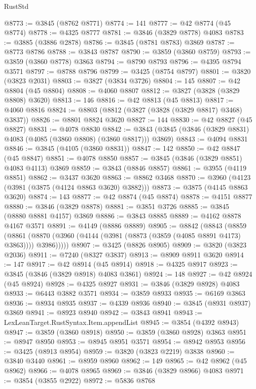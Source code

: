 \begin{lexlean}{RustStd}
\begin{coremodule}
@8773 := @3845 (@8762 @8771)
@8774 := 141
@8777 := @42 @8774 (@45 @8774)
@8778 := @4325 @8777
@8781 := @3846 (@3829 @8778) @4083
@8783 := @3885 (@3886 @2878)
@8786 := @3845 (@8781 @8783) @3869
@8787 := @8773 @8786
@8788 := @3843 @8787
@8790 := @3859 (@3860 @8759)
@8793 := @3859 (@3860 @8778) @3863
@8794 := @8790 @8793
@8796 := @4395 @8794 @3571
@8797 := @8788 @8796
@8799 := @3425 (@8754 @8797)
@8801 := @3820 (@3823 @2031)
@8803 := @3827 (@3834 @3726)
@8804 := 145
@8807 := @42 @8804 (@45 @8804)
@8808 := @4060 @8807
@8812 := @3827 (@3828 (@3829 @8808) @3620)
@8813 := 146
@8816 := @42 @8813 (@45 @8813)
@8817 := @4060 @8816
@8824 := @8803 (@8812 (@3827 (@3828 (@3829 @8817) @3468) @3837))
@8826 := @8801 @8824 @3620
@8827 := 144
@8830 := @42 @8827 (@45 @8827)
@8831 := @4078 @8830
@8842 := @3843 (@3845 (@3846 (@3829 @8831) @4083 (@4085 (@3860 @8808) (@3860 @8817))) @3869)
@8843 := @4094 @8831
@8846 := @3845 (@4105 (@3860 @8831))
@8847 := 142
@8850 := @42 @8847 (@45 @8847)
@8851 := @4078 @8850
@8857 := @3845 (@3846 (@3829 @8851) @4083 @4113) @3869
@8859 := @3843 (@8846 @8857)
@8861 := @3955 (@4119 @8851)
@8862 := @3437 @3620
@8863 := @8862 @3468
@8870 := @3960 (@4123 (@3981 (@3875 (@4124 @8863 @3620) @3882)))
@8873 := @3875 (@4145 @8863 @3620)
@8874 := 143
@8877 := @42 @8874 (@45 @8874)
@8878 := @4151 @8877
@8880 := @3846 (@3829 @8878)
@8881 := @3851 @3726
@8885 := @3845 (@8880 @8881 @4157) @3869
@8886 := @3843 @8885
@8889 := @4162 @8878 @4167 @3571
@8891 := @4149 (@8886 @8889)
@8905 := @8842
    (@8843
      (@8859
        (@8861 (@8870 (@3960 (@4144 (@3981 (@8873 (@3859 (@4085 @8891 @4173) @3863)))) @3986)))))
@8907 := @3425 (@8826 @8905)
@8909 := @3820 (@3823 @2036)
@8911 := @7240 (@8327 @3837)
@8913 := @8909 @8911 @3620
@8914 := 147
@8917 := @42 @8914 (@45 @8914)
@8918 := @4325 @8917
@8923 := @3845 (@3846 (@3829 @8918) @4083 @3861)
@8924 := 148
@8927 := @42 @8924 (@45 @8924)
@8928 := @4325 @8927
@8931 := @3846 (@3829 @8928) @4083
@8933 := @6443 @3882 @3571
@8934 := @3859 @8933
@8935 := @6169 @3863
@8936 := @8934 @8935
@8937 := @4339 @8936
@8940 := @3845 (@8931 @8937) @3869
@8941 := @8923 @8940
@8942 := @3843 @8941
@8943 := LexLeanTarget.RustSyntax.Item.appendList
@8945 := @3854 (@4392 @8943)
@8947 := @3859 (@3860 @8918)
@8950 := @3859 (@3860 @8928) @3863
@8951 := @8947 @8950
@8953 := @8945 @8951 @3571
@8954 := @8942 @8953
@8956 := @3425 (@8913 @8954)
@8959 := @3820 (@3823 @2219) @3838
@8960 := @3840 @3440
@8961 := @8959 @8960
@8962 := 149
@8965 := @42 @8962 (@45 @8962)
@8966 := @4078 @8965
@8969 := @3846 (@3829 @8966) @4083
@8971 := @3854 (@3855 @2922)
@8972 := @5836 @8768

\end{coremodule}
\end{lexlean}
